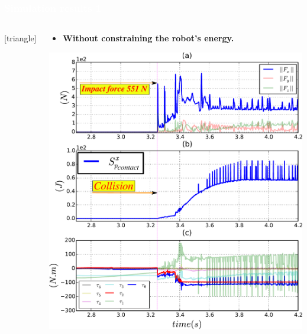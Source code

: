 \begin{frame}[noframenumbering]
\frametitle{{\textcolor{white}{\hspace{0.2cm}Simulation results 1}}}
\begin{columns}
\column{\dimexpr\paperwidth-4pt}
[triangle] 
\begin{itemize}
\begin{columns}
\column{.5\paperwidth}
\begin{center}
\begin{itemize}
\addtolength{\itemindent}{3mm}
\item \textbf{Without constraining the robot's energy.}
\end{itemize}
\vspace{0.5mm}
\hspace{1mm}
\includegraphics[width=0.89\columnwidth]{figures/ep__f_tau_!!!!3.pdf}
\end{center}


\end{columns}
\end{itemize}
\end{columns}
\end{frame}
